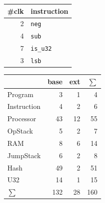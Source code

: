 \documentclass{article}
\begin{document}
\begin{minipage}[t][0.6\textheight][s]{0.3\textwidth}
    \vfill
    \begin{tabular}{rl}
        \toprule
        \#clk & instruction      \\ \midrule
            2 & \texttt{neg}     \\
            4 & \texttt{sub}     \\
            7 & \texttt{is\_u32} \\
            3 & \texttt{lsb}     \\ \bottomrule
    \end{tabular}
    \vspace*{3em}

    \begin{tabular}{lrrr}
        \toprule
                    & base & ext & $\sum$ \\ \midrule
        Program     &    3 &   1 &      4 \\
        Instruction &    4 &   2 &      6 \\
        Processor   &   43 &  12 &     55 \\
        OpStack     &    5 &   2 &      7 \\
        RAM         &    8 &   6 &     14 \\
        JumpStack   &    6 &   2 &      8 \\
        Hash        &   49 &   2 &     51 \\
        U32         &   14 &   1 &     15 \\ \bottomrule\bottomrule
        $\sum$      &  132 &  28 &    160
    \end{tabular}
\end{minipage}%
\hfill%
\end{document}

